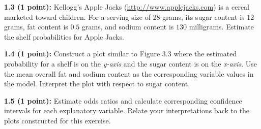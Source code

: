 \documentclass[]{article}
\begin{document}
\textbf{1.3 (1 point):} Kellogg's Apple Jacks
(\url{http://www.applejacks.com}) is a cereal marketed toward children.
For a serving size of \(28\) grams, its sugar content is \(12\) grams,
fat content is \(0.5\) grams, and sodium content is \(130\) milligrams.
Estimate the shelf probabilities for Apple Jacks.

\textbf{1.4 (1 point):} Construct a plot similar to Figure 3.3 where the
estimated probability for a shelf is on the \emph{y-axis} and the sugar
content is on the \emph{x-axis}. Use the mean overall fat and sodium
content as the corresponding variable values in the model. Interpret the
plot with respect to sugar content.

\textbf{1.5 (1 point):} Estimate odds ratios and calculate corresponding
confidence intervals for each explanatory variable. Relate your
interpretations back to the plots constructed for this exercise.
\end{document}
